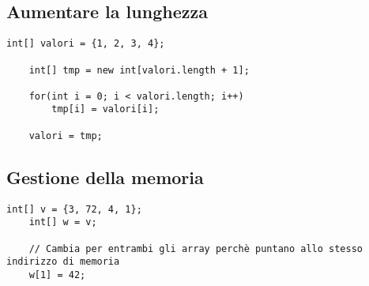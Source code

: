 \documentclass[../main.tex]{subfiles}
\begin{document}
\vspace{0.5cm}
\subsection{Aumentare la lunghezza}
\begin{lstlisting}[style=java]
    int[] valori = {1, 2, 3, 4};

    int[] tmp = new int[valori.length + 1]; 

    for(int i = 0; i < valori.length; i++)
        tmp[i] = valori[i];

    valori = tmp;
\end{lstlisting}

\pagebreak
\subsection{Gestione della memoria}
\begin{lstlisting}[style=java]
    int[] v = {3, 72, 4, 1};
    int[] w = v;

    // Cambia per entrambi gli array perchè puntano allo stesso indirizzo di memoria
    w[1] = 42;
\end{lstlisting}
\end{document}
